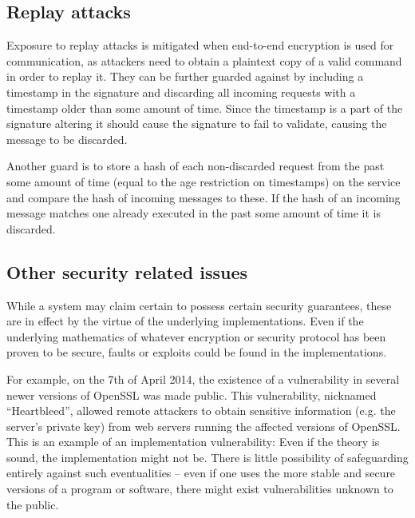 
\subsection{Replay attacks}
Exposure to replay attacks is mitigated when end-to-end encryption is used for communication, as attackers need to obtain a plaintext copy of a valid command in order to replay it.
They can be further guarded against by including a timestamp in the signature and discarding all incoming requests with a timestamp older than some amount of time.
Since the timestamp is a part of the signature altering it should cause the signature to fail to validate, causing the message to be discarded.

Another guard is to store a hash of each non-discarded request from the past some amount of time (equal to the age restriction on timestamps) on the service and compare the hash of incoming messages to these.
If the hash of an incoming message matches one already executed in the past some amount of time it is discarded.

\subsection{Other security related issues}
While a system may claim certain to possess certain security guarantees, these are in effect by the virtue of the underlying implementations.
Even if the underlying mathematics of whatever encryption or security protocol has been proven to be secure, faults or exploits could be found in the implementations.

For example, on the 7th of April 2014, the existence of a vulnerability in several newer versions of OpenSSL was made public.
This vulnerability, nicknamed ``Heartbleed'', allowed remote attackers to obtain sensitive information (e.g. the server's private key) from web servers running the affected versions of OpenSSL.
This is an example of an implementation vulnerability: Even if the theory is sound, the implementation might not be.
There is little possibility of safeguarding entirely against such eventualities -- even if one uses the more stable and secure versions of a program or software, there might exist vulnerabilities unknown to the public.
